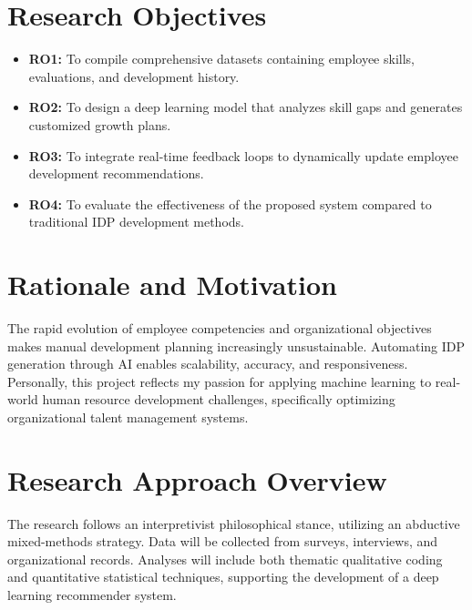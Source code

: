 

\section{Research Objectives}


\begin{itemize}
    \item \textbf{RO1:} To compile comprehensive datasets containing employee skills, evaluations, and development history.
    \item \textbf{RO2:} To design a deep learning model that analyzes skill gaps and generates customized growth plans.
    \item \textbf{RO3:} To integrate real-time feedback loops to dynamically update employee development recommendations.
    \item \textbf{RO4:} To evaluate the effectiveness of the proposed system compared to traditional IDP development methods.
\end{itemize}
\section{Rationale and Motivation}
The rapid evolution of employee competencies and organizational objectives makes manual development planning increasingly unsustainable. Automating IDP generation through AI enables scalability, accuracy, and responsiveness. Personally, this project reflects my passion for applying machine learning to real-world human resource development challenges, specifically optimizing organizational talent management systems.

\section{Research Approach Overview}
The research follows an interpretivist philosophical stance, utilizing an abductive mixed-methods strategy. Data will be collected from surveys, interviews, and organizational records. Analyses will include both thematic qualitative coding and quantitative statistical techniques, supporting the development of a deep learning recommender system.





